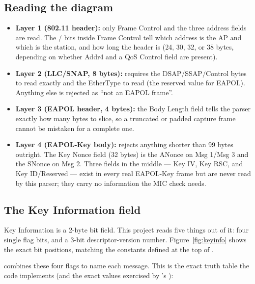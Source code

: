 \FIGTHREE

\subsection{Reading the diagram}
\begin{itemize}
\item \textbf{Layer 1 (802.11 header):} only Frame Control and the three address fields are read. The / bits inside Frame Control tell  which address is the AP and which is the station, and how long the header is (24, 30, 32, or 38 bytes, depending on whether Addr4 and a QoS Control field are present).
\item \textbf{Layer 2 (LLC/SNAP, 8 bytes):}  requires the DSAP/SSAP/Control bytes to read exactly  and the EtherType to read  (the reserved value for EAPOL). Anything else is rejected as ``not an EAPOL frame''.
\item \textbf{Layer 3 (EAPOL header, 4 bytes):} the Body Length field tells the parser exactly how many bytes to slice, so a truncated or padded capture frame cannot be mistaken for a complete one.
\item \textbf{Layer 4 (EAPOL-Key body):}  rejects anything shorter than 99 bytes outright. The Key Nonce field (32 bytes) is the ANonce on Msg 1/Msg 3 and the SNonce on Msg 2. Three fields in the middle --- Key IV, Key RSC, and Key ID/Reserved --- exist in every real EAPOL-Key frame but are never read by this parser; they carry no information the MIC check needs.
\end{itemize}

\subsection{The Key Information field}\label{sec:keyinfo}
Key Information is a 2-byte bit field. This project reads five things out of it: four single flag bits, and a 3-bit descriptor-version number. Figure~\ref{fig:keyinfo} shows the exact bit positions, matching the constants defined at the top of .

\FIGFOUR

 combines these four flags to name each message. This is the exact truth table the code implements (and the exact values exercised by 's ):

